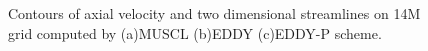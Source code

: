 \begin{figure}[t]
     \caption{Contours of axial velocity and two dimensional streamlines on 14M grid computed by (a)MUSCL (b)EDDY (c)EDDY-P scheme.}
     \label{w1} 
\end{figure}
